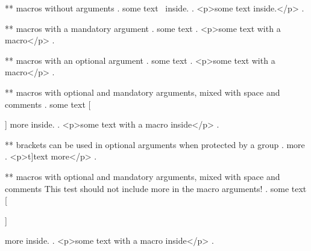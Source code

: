 ** macros without arguments
.
some text \echo\ inside.
.
<p>some text  inside.</p>
.

** macros with a mandatory argument
.
some text 
.
<p>some text with a macro</p>
.

** macros with an optional argument
.
some text 
.
<p>some text with a macro</p>
.


** macros with optional and mandatory arguments, mixed with space and comments
.
some text  [%

 ]
 {more} inside.
.
<p>some text with a macro inside</p>
.


** brackets can be used in optional arguments when protected by a group
.
\echo[{t]}t]{ext} more
.
<p>t]text more</p>
.



** macros with optional and mandatory arguments, mixed with space and comments
This test should not include {more} in the macro arguments!
.
some text  [%

 ]%

  {more} inside.
.
<p>some text with a macro inside</p>
.
